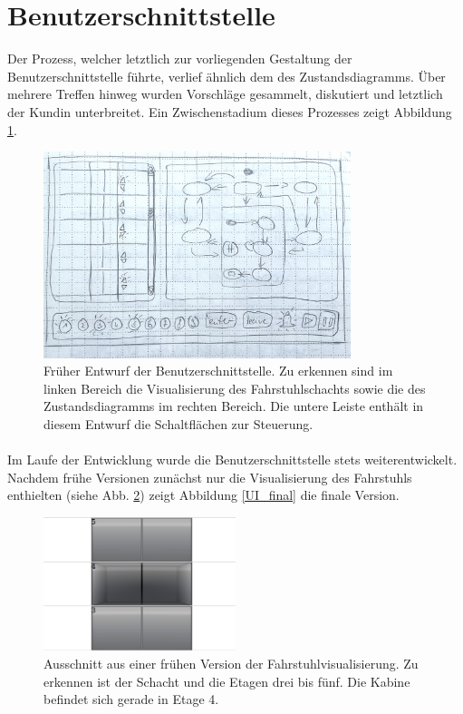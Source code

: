 \section{Benutzerschnittstelle}
Der Prozess, welcher letztlich zur vorliegenden Gestaltung der Benutzerschnittstelle führte, verlief ähnlich dem des Zustandsdiagramms. Über mehrere Treffen hinweg wurden Vorschläge gesammelt, diskutiert und letztlich der Kundin unterbreitet. Ein Zwischenstadium dieses Prozesses zeigt Abbildung \ref{Entwurf_UI}.

\begin{figure}[h!]
	\centering
	\includegraphics[width=0.8\textwidth]{images/Entwurf_UI}
	\caption{Früher Entwurf der Benutzerschnittstelle. Zu erkennen sind im linken Bereich die Visualisierung des Fahrstuhlschachts sowie die des Zustandsdiagramms im rechten Bereich. Die untere Leiste enthält in diesem Entwurf die Schaltflächen zur Steuerung.}
	\label{Entwurf_UI}
\end{figure}

\hspace*{2cm}
\paragraph{}Im Laufe der Entwicklung wurde die Benutzerschnittstelle stets weiterentwickelt. Nachdem frühe Versionen zunächst nur die Visualisierung des Fahrstuhls enthielten (siehe Abb. \ref{UI_ealry}) zeigt Abbildung \ref{UI_final} die finale Version.

\hspace*{2cm}
\begin{figure}[h!]
	\centering
	\includegraphics[width=0.5\textwidth]{images/UI_frueh.png}
	\caption{Ausschnitt aus einer frühen Version der Fahrstuhlvisualisierung. Zu erkennen ist der Schacht und die Etagen drei bis fünf. Die Kabine befindet sich gerade in Etage 4.}
	\label{UI_ealry}
\end{figure}

